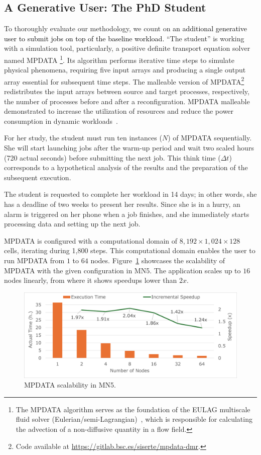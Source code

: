 \documentclass[a4paper,fleqn]{cas-dc}
\newcommand{\sergio}[1]{\textcolor{black}{#1}}
\begin{document}
\subsection{A Generative User: The PhD Student}
\label{subsec:phdstudent}
To thoroughly evaluate our methodology, we count on \sergio{an additional generative user to submit jobs on top of the baseline workload.}
``The student'' is working with a simulation tool, particularly, a positive definite transport equation solver named MPDATA%
\footnote{
The MPDATA algorithm serves as the foundation of the EULAG multiscale fluid solver (Eulerian/semi-Lagrangian)~\cite{rojek_parallelization_2015}, which is responsible for calculating the advection of a non-diffusive quantity in a flow field.
}.
Its algorithm performs iterative time steps to simulate physical phenomena, requiring five input arrays and producing a single output array essential for subsequent time steps. 
The malleable version of MPDATA\footnote{Code available at \url{https://gitlab.bsc.es/siserte/mpdata-dmr}.} redistributes the input arrays between source and target processes, respectively, the number of processes before and after a reconfiguration.
MPDATA malleable demonstrated to increase the utilization of resources and reduce the power consumption in dynamic workloads~\cite{iserte_study_2020}.

For her study, the student must run ten instances ($N$) of MPDATA sequentially.
She will start launching jobs after the warm-up period and wait two scaled hours (720 actual seconds) before submitting the next job. 
This think time ($\Delta t$) corresponds to a hypothetical analysis of the results and the preparation of the subsequent execution.

The student is requested to complete her workload in 14 days; in other words, she has a deadline of two weeks to present her results.
Since she is in a hurry, an alarm is triggered on her phone when a job finishes, and she immediately starts processing data and setting up the next job.

MPDATA is configured with a computational domain of $8,192\times 1,024\times 128$ cells, iterating during 1,800 steps. 
This computational domain enables the user to run MPDATA from $1$ to $64$ nodes.
Figure~\ref{fig:mpdata-speedup} showcases the scalability of MPDATA with the given configuration in MN5.
The application scales up to $16$ nodes linearly, from where it shows speedups lower than $2x$.

\begin{figure}[tbp]
    \centering
\includegraphics[clip,width=0.9\linewidth,trim={0.1cm 0.5cm 0.1cm 0.1cm}]{figures/mpdata.png}
    \caption{MPDATA scalability in MN5.}
    \label{fig:mpdata-speedup}
\end{figure}
\end{document}
